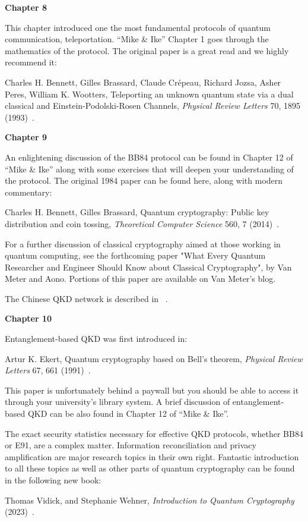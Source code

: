 {\bf Chapter 8}

This chapter introduced one the most fundamental protocols of quantum communication, teleportation. “Mike \& Ike” Chapter 1 goes through the mathematics of the protocol. The original paper is a great read and we highly recommend it:

Charles H. Bennett, Gilles Brassard, Claude Crépeau, Richard Jozsa, Asher Peres, William K. Wootters, Teleporting an unknown quantum state via a dual classical and Einstein-Podolski-Rosen Channels, \emph{Physical Review Letters} 70, 1895 (1993)~\cite{bennett:teleportation}.

{\bf Chapter 9}

An enlightening discussion of the BB84 protocol can be found in Chapter 12 of “Mike \& Ike” along with some exercises that will deepen your understanding of the protocol.
The original 1984 paper can be found here, along with modern commentary:

Charles H. Bennett, Gilles Brassard, Quantum cryptography: Public key distribution and coin tossing, \emph{Theoretical Computer Science} 560, 7 (2014)~\cite{bennett:bb84}.

For a further discussion of classical cryptography aimed at those working in quantum computing, see the forthcoming paper "What Every Quantum Researcher and Engineer Should Know about Classical Cryptography", by Van Meter and Aono.  Portions of this paper are available on Van Meter's blog.

The Chinese QKD network is described in ~\cite{chen2021integrated}.

{\bf Chapter 10}

Entanglement-based QKD was first introduced in:

Artur K. Ekert, Quantum cryptography based on Bell’s theorem, \emph{Physical Review Letters} 67, 661 (1991)~\cite{ekert1991qcb}.

This paper is unfortunately behind a paywall but you should be able to access it through your university’s library system.
A brief discussion of entanglement-based QKD can be also found in Chapter 12 of “Mike \& Ike”.

The exact security statistics necessary for effective QKD protocols, whether BB84 or E91, are a complex matter.  Information reconciliation and privacy amplification are major research topics in their own right.
Fantastic introduction to all these topics as well as other parts of quantum cryptography can be found in the following new book:

Thomas Vidick, and Stephanie Wehner, \emph{Introduction to Quantum Cryptography} (2023)~\cite{vidick_wehner_2023}.